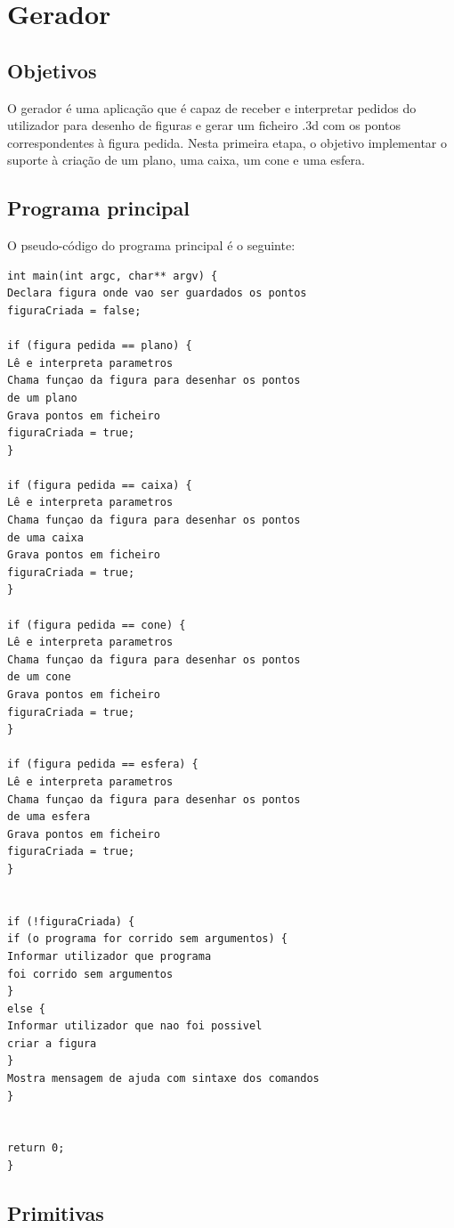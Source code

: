 \chapter{Gerador}
\label{cap:p1}

\section{Objetivos}

O gerador é uma aplicação que é capaz de receber e interpretar pedidos do utilizador para desenho de figuras e gerar um ficheiro .3d com os pontos correspondentes à figura pedida.
Nesta primeira etapa, o objetivo implementar o suporte à criação de um plano, uma caixa, um cone e uma esfera.

\section{Programa principal}

O pseudo-código do programa principal é o seguinte:


\begin{Verbatim}
int main(int argc, char** argv) {
Declara figura onde vao ser guardados os pontos
figuraCriada = false;

if (figura pedida == plano) {
Lê e interpreta parametros
Chama funçao da figura para desenhar os pontos 
de um plano
Grava pontos em ficheiro
figuraCriada = true;
}

if (figura pedida == caixa) {
Lê e interpreta parametros
Chama funçao da figura para desenhar os pontos
de uma caixa
Grava pontos em ficheiro
figuraCriada = true;
}

if (figura pedida == cone) {
Lê e interpreta parametros
Chama funçao da figura para desenhar os pontos 
de um cone
Grava pontos em ficheiro
figuraCriada = true;
}

if (figura pedida == esfera) {
Lê e interpreta parametros
Chama funçao da figura para desenhar os pontos
de uma esfera
Grava pontos em ficheiro
figuraCriada = true;
}


if (!figuraCriada) {
if (o programa for corrido sem argumentos) {
Informar utilizador que programa 
foi corrido sem argumentos
}
else {
Informar utilizador que nao foi possivel
criar a figura
}
Mostra mensagem de ajuda com sintaxe dos comandos
}


return 0;
}

\end{Verbatim}

\section{Primitivas}

